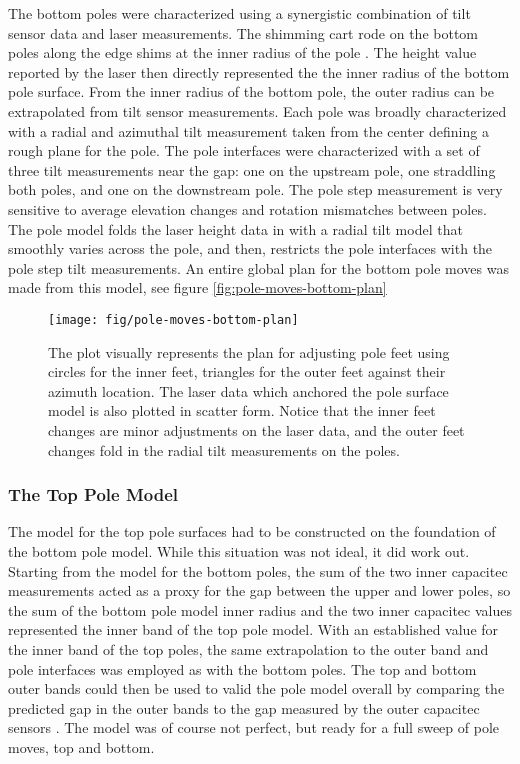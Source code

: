 The bottom poles were characterized using a synergistic combination of tilt sensor data and laser measurements.  The shimming cart rode on the bottom poles along the edge shims at the inner radius of the pole . The height value reported by the laser then directly represented the the inner radius of the bottom pole surface.  From the inner radius of the bottom pole, the outer radius can be extrapolated from tilt sensor measurements.  Each pole was broadly characterized with a radial and azimuthal tilt measurement taken from the center defining a rough plane for the pole.  The pole interfaces were characterized with a set of three tilt measurements near the gap: one on the upstream pole, one straddling both poles, and one on the downstream pole.  The pole step measurement is very sensitive to average elevation changes and rotation mismatches between poles.  The pole model folds the laser height data in with a radial tilt model that smoothly varies across the pole, and then, restricts the pole interfaces with the pole step tilt measurements.  An entire global plan for the bottom pole moves was made from this model, see figure \ref{fig:pole-moves-bottom-plan}

\begin{figure}
\texttt{[image: fig/pole-moves-bottom-plan]}
\caption{The plot visually represents the plan for adjusting pole feet using circles for the inner feet, triangles for the outer feet against their azimuth location.  The laser data which anchored the pole surface model is also plotted in scatter form.  Notice that the inner feet changes are minor adjustments on the laser data, and the outer feet changes fold in the radial tilt measurements on the poles.}
\label{fig:bottom-pole-adjustment-plan}
\end{figure}

\subsubsection{The Top Pole Model}

The model for the top pole surfaces had to be constructed on the foundation of the bottom pole model.  While this situation was not ideal, it did work out.  Starting from the model for the bottom poles, the sum of the two inner capacitec measurements acted as a proxy for the gap between the upper and lower poles, so the sum of the bottom pole model inner radius and the two inner capacitec values represented the inner band of the top pole model.  With an established value for the inner band of the top poles, the same extrapolation to the outer band and pole interfaces was employed as with the bottom poles.  The top and bottom outer bands could then be used to valid the pole model overall by comparing the predicted gap in the outer bands to the gap measured by the outer capacitec sensors .  The model was of course not perfect, but ready for a full sweep of pole moves, top and bottom.

